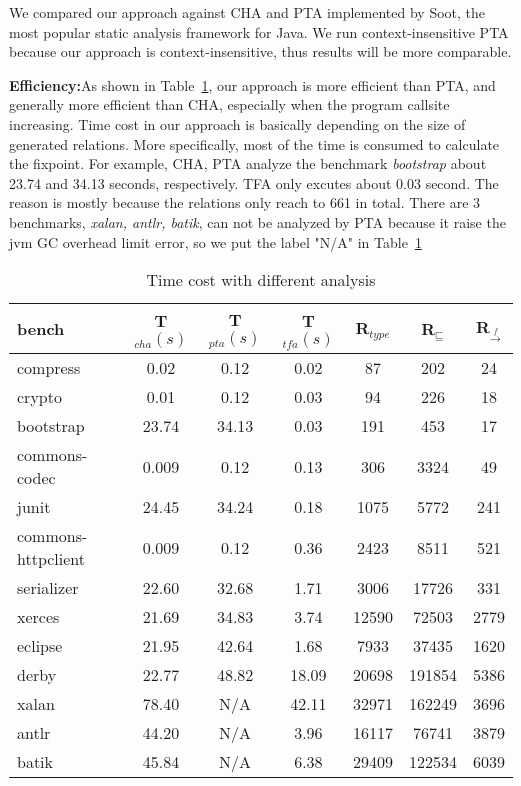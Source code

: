 \documentclass{llncs}
\newcommand{\less}{\sqsubseteq}
\newcommand{\hflow}{\rightarrow}
\newcommand{\lhflow}[1]{\stackrel{#1}{\hflow}}
\begin{document}
We compared our approach against CHA and PTA implemented by Soot, the most popular static analysis framework for Java. We run context-insensitive PTA because our approach is context-insensitive, thus results will be more comparable.

\textbf{Efficiency:}As shown in Table~\ref{experiment:Time Cost}, our approach is more efficient than PTA, and generally more efficient than CHA, especially when the program callsite increasing. Time cost in our approach is basically depending on the size of generated relations. More specifically, most of the time is consumed to calculate the fixpoint. For example, CHA, PTA analyze the benchmark \textit{bootstrap} about 23.74 and 34.13 seconds, respectively. TFA only excutes about 0.03 second. The reason is mostly because the relations only reach to 661 in total. There are 3 benchmarks, \textit{xalan, antlr, batik}, can not be analyzed by PTA because it raise the jvm GC overhead limit error, so we put the label "N/A" in Table~\ref{experiment:Time Cost}

\begin{table}[!htbp]\centering
\caption{Time cost with different analysis}
\begin{tabular}{lcccccc}
	\hline
	\textbf{bench} & \textbf{T$_{cha}(s)$} & \textbf{T$_{pta}(s)$} & \textbf{T$_{tfa}(s)$} & \textbf{R$_{type}$} & \textbf{R$_{\less}$} & \textbf{R$_{\lhflow{f}}$} \\
	\hline
	compress & 0.02 & 0.12 & 0.02 & 87 & 202 & 24\\
	crypto & 0.01 & 0.12 & 0.03 & 94 & 226 & 18\\
	bootstrap & 23.74 & 34.13 & 0.03 & 191 & 453 & 17\\
	commons-codec & 0.009 & 0.12 & 0.13 & 306 & 3324 & 49\\
	junit & 24.45 & 34.24 & 0.18 & 1075 & 5772 & 241\\
	commons-httpclient & 0.009 & 0.12 & 0.36 & 2423 & 8511 & 521 \\
	serializer & 22.60 & 32.68 & 1.71 & 3006 & 17726 & 331\\
	xerces & 21.69 & 34.83 & 3.74 & 12590 & 72503 & 2779\\
	eclipse & 21.95 & 42.64 & 1.68 & 7933 & 37435 & 1620\\
	derby & 22.77 & 48.82 & 18.09 & 20698 & 191854 & 5386\\
	xalan & 78.40 & N/A & 42.11 & 32971 & 162249 & 3696\\
	antlr & 44.20 & N/A & 3.96 & 16117 & 76741 & 3879\\
	batik & 45.84 & N/A & 6.38 & 29409 & 122534 & 6039 \\
	\hline
\end{tabular}
\label{experiment:Time Cost}
\end{table}
\end{document}
